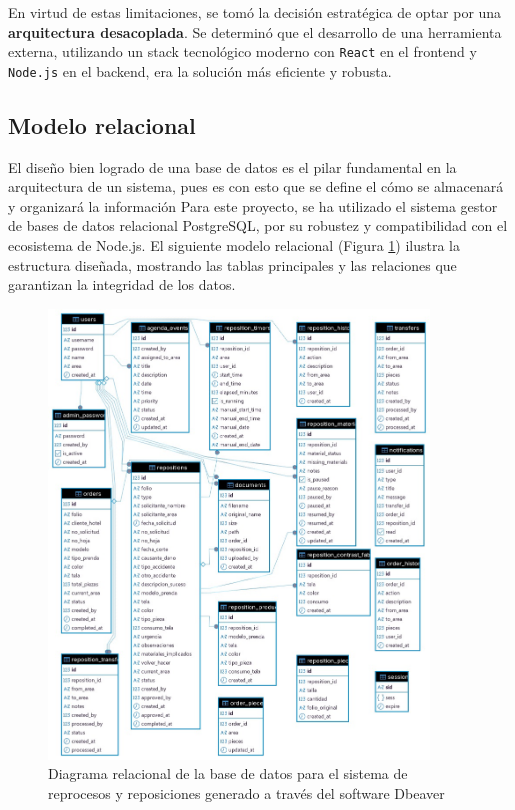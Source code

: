 \documentclass[12pt,letterpaper,spanish]{report}
\begin{document}
En virtud de estas limitaciones, se tomó la decisión estratégica de optar por una \textbf{arquitectura desacoplada}. Se determinó que el desarrollo de una herramienta externa, utilizando un stack tecnológico moderno con \texttt{React} en el frontend y \texttt{Node.js} en el backend, era la solución más eficiente y robusta. 




\subsection{Modelo relacional}
El diseño bien logrado de una base de datos es el pilar fundamental en la arquitectura de un sistema, pues es con esto que se define el cómo se almacenará y organizará la información Para este proyecto, se ha utilizado el sistema gestor de bases de datos relacional PostgreSQL, por su robustez y compatibilidad con el ecosistema de Node.js. El siguiente modelo relacional (Figura \ref{ER}) ilustra la estructura diseñada, mostrando las tablas principales y las relaciones que garantizan la integridad de los datos.
\begin{figure}[H]
  \centering
  \includegraphics[width=0.9\textwidth]{jasanaordenes - public.jpg}
  \caption{Diagrama relacional de la base de datos para el sistema de reprocesos y reposiciones generado a través del software Dbeaver}\label{ER}
\end{figure} 
 
\end{document}
